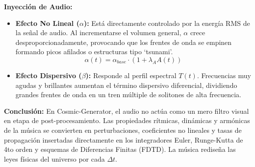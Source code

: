 \documentclass[12pt]{article}
\begin{document}
\textbf{Inyección de Audio:}
\begin{itemize}
    \item \textbf{Efecto No Lineal ($\alpha$):} Está directamente controlado por la energía RMS de la señal de audio. Al incrementarse el volumen general, $\alpha$ crece desproporcionadamente, provocando que los frentes de onda se empinen formando picos afilados o estructuras tipo `tsunami'.
    $$\alpha(t) = \alpha_{base} \cdot (1 + \lambda_A A(t))$$
    \item \textbf{Efecto Dispersivo ($\beta$):} Responde al perfil espectral $T(t)$. Frecuencias muy agudas y brillantes aumentan el término dispersivo diferencial, dividiendo grandes frentes de onda en un tren múltiple de solitones de alta frecuencia.
\end{itemize}

\vspace{0.5cm}
\textbf{Conclusión:}
En Cosmic-Generator, el audio no actúa como un mero filtro visual en etapa de post-procesamiento. Las propiedades rítmicas, dinámicas y armónicas de la música se convierten en perturbaciones, coeficientes no lineales y tasas de propagación insertadas directamente en los integradores Euler, Runge-Kutta de 4to orden y esquemas de Diferencias Finitas (FDTD). La música rediseña las leyes físicas del universo por cada $\Delta t$.
\end{document}
